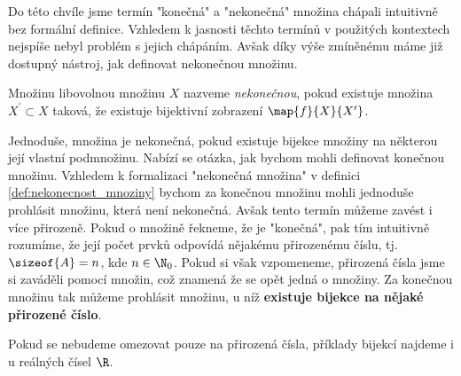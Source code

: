 Do této chvíle jsme termín "konečná" a "nekonečná" množina chápali intuitivně bez formální definice. Vzhledem k jasnosti těchto termínů v použitých kontextech nejspíše nebyl problém s jejich chápáním. Avšak díky výše zmíněnému máme již dostupný nástroj, jak definovat nekonečnou množinu.
\begin{definition}\label{def:nekonecnost_mnoziny}
    Množinu libovolnou množinu $X$ nazveme \emph{nekonečnou}, pokud existuje množina $X^\prime\subset X$ taková, že existuje bijektivní zobrazení $\map{f}{X}{X^\prime}$. 
\end{definition}
Jednoduše, množina je nekonečná, pokud existuje bijekce množiny na některou její vlastní podmnožinu. Nabízí se otázka, jak bychom mohli definovat konečnou množinu. Vzhledem k formalizaci "nekonečná množina" v definici \ref{def:nekonecnost_mnoziny} bychom za konečnou množinu mohli jednoduše prohlásit množinu, která není nekonečná. Avšak tento termín můžeme zavést i více přirozeně. Pokud o množině řekneme, že je "konečná", pak tím intuitivně rozumíme, že její počet prvků odpovídá nějakému přirozenému číslu, tj. $\sizeof{A}=n$, kde $n\in\N_0$. Pokud si však vzpomeneme, přirozená čísla jsme si zaváděli pomocí množin, což znamená že se opět jedná o množiny. Za konečnou množinu tak můžeme prohlásit množinu, u níž \textbf{existuje bijekce na nějaké přirozené číslo}.\par
Pokud se nebudeme omezovat pouze na přirozená čísla, příklady bijekcí najdeme i u reálných čísel $\R$.
